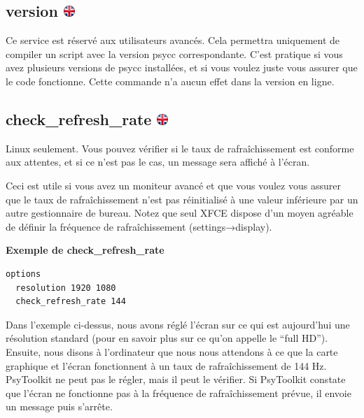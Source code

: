 \documentclass[
]{book}
\begin{document}
\hypertarget{version}{%
\subsection[version ]{\texorpdfstring{version \href{https://www.psytoolkit.org/doc3.2.0/syntax.html\#options-version}{\protect\includegraphics{img/ukflag.png}}}{version }}\label{version}}

Ce service est réservé aux utilisateurs avancés. Cela permettra uniquement de compiler un script avec la version psycc correspondante. C'est pratique si vous avez plusieurs versions de psycc installées, et si vous voulez juste vous assurer que le code fonctionne. Cette commande n'a aucun effet dans la version en ligne.

\hypertarget{check_refresh_rate}{%
\subsection[check\_refresh\_rate ]{\texorpdfstring{check\_refresh\_rate \href{https://www.psytoolkit.org/doc3.2.0/syntax.html\#options-check-refresh-rate}{\protect\includegraphics{img/ukflag.png}}}{check\_refresh\_rate }}\label{check_refresh_rate}}

Linux seulement. Vous pouvez vérifier si le taux de rafraîchissement est conforme aux attentes, et si ce n'est pas le cas, un message sera affiché à l'écran.

Ceci est utile si vous avez un moniteur avancé et que vous voulez vous assurer que le taux de rafraîchissement n'est pas réinitialisé à une valeur inférieure par un autre gestionnaire de bureau. Notez que seul XFCE dispose d'un moyen agréable de définir la fréquence de rafraîchissement (settings→display).

\textbf{Exemple de check\_refresh\_rate}

\begin{verbatim}
options
  resolution 1920 1080
  check_refresh_rate 144
\end{verbatim}

Dans l'exemple ci-dessus, nous avons réglé l'écran sur ce qui est aujourd'hui une résolution standard (pour en savoir plus sur ce qu'on appelle le ``full HD''). Ensuite, nous disons à l'ordinateur que nous nous attendons à ce que la carte graphique et l'écran fonctionnent à un taux de rafraîchissement de 144 Hz. PsyToolkit ne peut pas le régler, mais il peut le vérifier. Si PsyToolkit constate que l'écran ne fonctionne pas à la fréquence de rafraîchissement prévue, il envoie un message puis s'arrête.
\end{document}
